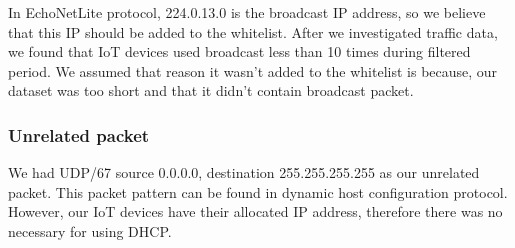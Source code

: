 In EchoNetLite protocol, 224.0.13.0 is the broadcast IP address, so we believe that this IP should be added to the whitelist. After we investigated traffic data, we found that IoT devices used broadcast less than 10 times during filtered period. We assumed that reason it wasn’t added to the whitelist is because, our dataset was too short and that it didn’t contain broadcast packet.  

\subsubsection{Unrelated packet}  
We had UDP/67 source 0.0.0.0, destination 255.255.255.255 as our unrelated packet. This packet pattern can be found in dynamic host configuration protocol. However, our IoT devices have their allocated IP address, therefore there was no necessary for using DHCP.

